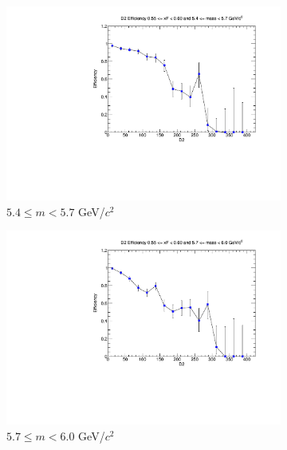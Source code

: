 \begin{figure}[p]
\begin{subfigure}[b]{0.32\textwidth}
        \includegraphics[width=\textwidth]{./kTrackerEfficiencyPlots/D2_Efficiency_xF11_mass4.pdf}
        \caption{$5.4 \leq m < 5.7$ GeV/$c^2$}
        \label{fig:xF11_mass4}
    \end{subfigure}
    \hfill
    \begin{subfigure}[b]{0.32\textwidth}
        \centering
        \includegraphics[width=\textwidth]{./kTrackerEfficiencyPlots/D2_Efficiency_xF11_mass5.pdf}
        \caption{$5.7 \leq m < 6.0$ GeV/$c^2$}
        \label{fig:xF11_mass5}
    \end{subfigure}
    \vspace{0.5cm}
    \begin{subfigure}[b]{0.32\textwidth}
        \centering

\end{subfigure}
\end{figure}
